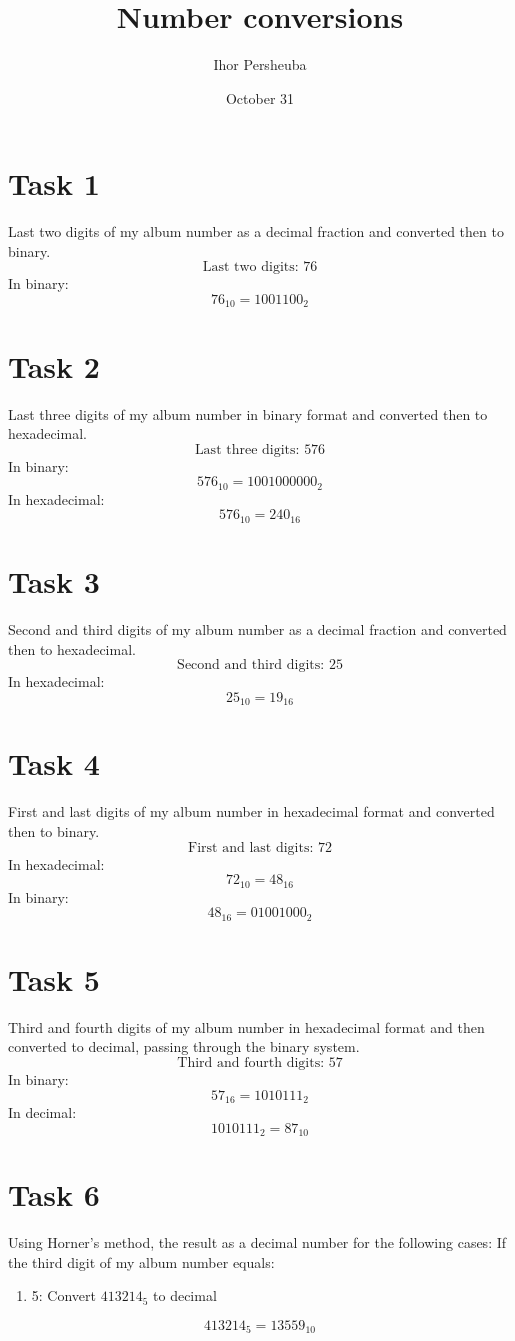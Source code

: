 \documentclass{article}
\begin{document}
\title{Number conversions}
\author{Ihor Persheuba}
\date{October 31}
\maketitle
\section*{Task 1}
Last two digits of my album number as a decimal fraction and converted then to binary.
\[
\text{Last two digits: } 76
\]
In binary:
\[
76_{10} = 1001100_2
\]
\section*{Task 2}
Last three digits of my album number in binary format and converted then to hexadecimal.
\[
\text{Last three digits: } 576
\]
In binary:
\[
576_{10} = 1001000000_2
\]
In hexadecimal:
\[
576_{10} = 240_{16}
\]
\section*{Task 3}
Second and third digits of my album number as a decimal fraction and converted then to hexadecimal.
\[
\text{Second and third digits: } 25
\]
In hexadecimal:
\[
25_{10} = 19_{16}
\]
\section*{Task 4}
First and last digits of my album number in hexadecimal format and converted then to binary.
\[
\text{First and last digits: } 72
\]
In hexadecimal:
\[
72_{10} = 48_{16}
\]
In binary:
\[
48_{16} = 01001000_2
\]
\section*{Task 5}
Third and fourth digits of my album number in hexadecimal format and then converted to decimal, passing through the binary system.
\[
\text{Third and fourth digits: } 57
\]
In binary:
\[
57_{16} = 1010111_2
\]
In decimal:
\[
1010111_2 = 87_{10}
\]
\section*{Task 6}
Using Horner's method, the result as a decimal number for the following cases:
If the third digit of my album number equals:
\begin{enumerate}
    \item 5: Convert \( 413214_5 \) to decimal
\end{enumerate}
\[
413214_5 = 13559_{10}
\]
\end{document}
